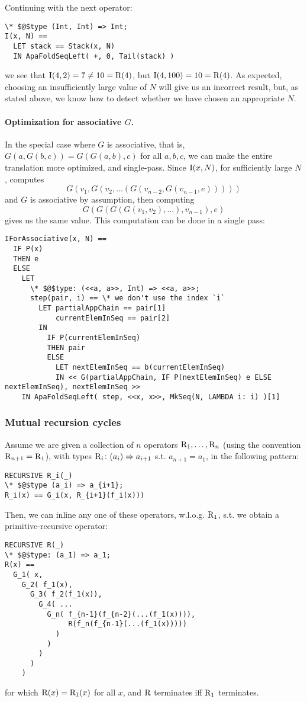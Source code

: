 \noindent Continuing with the next operator:
\begin{lstlisting}[language=tla,columns=fullflexible]
\* $@$type (Int, Int) => Int;
I(x, N) ==
  LET stack == Stack(x, N)
  IN ApaFoldSeqLeft( +, 0, Tail(stack) )
\end{lstlisting}
%
we see that $\mathrm{I}(4, 2) = 7 \ne 10 = \mathrm{R}(4)$, but $\mathrm{I}(4, 100) = 10 = \mathrm{R}(4)$.
As expected, choosing an insufficiently large value of $N$ will give us an incorrect result, but, as stated above, we know how to detect whether we have chosen an appropriate $N$.

\paragraph{ Optimization for associative $G$.}
In the special case where $G$ is associative, that is, $G(a, G(b, c)) = G(G(a, b), c)$ for all $a,b,c$, we can make the entire translation more optimized, and single-pass. Since $\mathrm{I}(x,N)$, for sufficiently large $N$, computes 
\[
G(v_1, G(v_2, ... (G(v_{n-2}, G(v_{n-1}, e)))))
\]
%
and $G$ is associative by assumption, then computing
\[
G(G(G(G(v_1, v_2), ...), v_{n-1}), e)
\]
gives us the same value. This computation can be done in a single pass:
\newpage
\begin{lstlisting}[language=tla,columns=fullflexible]
IForAssociative(x, N) ==
  IF P(x)
  THEN e
  ELSE
    LET 
      \* $@$type: (<<a, a>>, Int) => <<a, a>>;
      step(pair, i) == \* we don't use the index `i`
        LET partialAppChain == pair[1]
            currentElemInSeq == pair[2]
        IN
          IF P(currentElemInSeq)
          THEN pair
          ELSE
            LET nextElemInSeq == b(currentElemInSeq)
            IN << G(partialAppChain, IF P(nextElemInSeq) e ELSE nextElemInSeq), nextElemInSeq >>
    IN ApaFoldSeqLeft( step, <<x, x>>, MkSeq(N, LAMBDA i: i) )[1]
\end{lstlisting}

\subsubsection{ Mutual recursion cycles}

Assume we are given a collection of $n$ operators $\mathrm{R}_1, \dots, \mathrm{R}_n$ (using the convention $\mathrm{R}_{n+1} = \mathrm{R}_1$), with types $\mathrm{R}_i\colon (a_i) \Rightarrow a_{i+1}$ s.t. $a_{n+1} = a_1$, in the following pattern:

\begin{lstlisting}[language=tla,columns=fullflexible]
RECURSIVE R_i(_)
\* $@$type (a_i) => a_{i+1};
R_i(x) == G_i(x, R_{i+1}(f_i(x)))
\end{lstlisting}
%
Then, we can inline any one of these operators, w.l.o.g. $\mathrm{R}_1$, s.t. we obtain a primitive-recursive operator:
\begin{lstlisting}[language=tla,columns=fullflexible]
RECURSIVE R(_)
\* $@$type: (a_1) => a_1;
R(x) ==
  G_1( x, 
    G_2( f_1(x),
      G_3( f_2(f_1(x)),
        G_4( ...
          G_n( f_{n-1}(f_{n-2}(...(f_1(x)))), 
               R(f_n(f_{n-1}(...(f_1(x)))))
            )
          )
        )
      )
    )
\end{lstlisting}
for which $\mathrm{R}(x) = \mathrm{R}_1(x)$ for all $x$, and $\mathrm{R}$ terminates iff $\mathrm{R}_1$ terminates.

